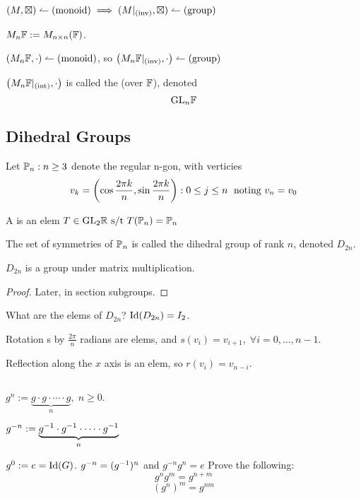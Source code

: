 \documentclass[12pt]{article}
\newcommand{\gop}[0]{\boxtimes}
\begin{document}
\((M,\gop)\is\TM{monoid}
\implies(M|_{\TM{inv}},\gop)\is\TM{group}\)

\bboxex
{} \(M_n\mathbb F:=M_{n\times n}(\mathbb F)\).

\((M_n\mathbb F,\cdot)\leftharpoonup(\mathrm{monoid})\), so
\(\left(M_n\mathbb F|_{(\mathrm{inv})},\cdot\right)
\leftharpoonup(\mathrm{group})\)
\ebox


\bboxnote
\begin{nota}\label{nota:gen_L_group}
  \(\left(M_n\mathbb F|_{(\mathrm{int})},\cdot\right)\)
  is called the 
  (over \(\mathbb F\)), denoted
  \[\mathrm{GL}_n\mathbb F\]
\end{nota}
\ebox

\subsection{Dihedral Groups}
\bbox
\begin{defn}[N-Gon]\label{defn:n_gon}
  Let \(\mathbb P_n:n\ge3\) denote the regular
  n-gon, with verticies
  \[v_k=\left(
      \cos\frac{2\pi k}n,
      \sin\frac{2\pi k}n
  \right):0\le j\le n\;
\text{ noting }v_n=v_0\]
\end{defn}
\ebox

\bbox
\begin{defn}
  A  is an
  elem \(T\in\mathrm{GL}_2\mathbb R\text{ s/t }
  T(\mathbb P_n)=\mathbb P_n\)
\end{defn}
\ebox

\bbox
\begin{defn}\label{defn:dihedral_group}
  The set of symmetries of \(\mathbb P_n\) is called the dihedral group of rank \(n\), denoted \(D_{2n}\).
\end{defn}
\ebox

\bbox
\begin{lem}
  \(D_{2n}\) is a group under matrix multiplication.
\end{lem}
\ebox

\bboxproof
\begin{proof}
  Later, in section subgroups.
\end{proof}
\ebox

What are the elems of \(D_{2n}\)?
\(\mathrm{Id}(D_{2n})=I_2\).

Rotation s by \(\frac{2\pi}n\) radians are elems, and \(s(v_i)=v_{i+1},\;\forall i=0,\dots,n-1\).

Reflection along the \(x\) axis is an elem, so \(r(v_i)=v_{n-i}\).


\bbox
\begin{defn}\label{defn:group_power}
  \(\,\)

  \(g^n:=\underset n{\underbrace{g\cdot g\cdot \cdots \cdot g}},\;n\ge 0\).

  \(g^{-n}:=\underset n{\underbrace{g^{-1}\cdot g^{-1}\cdot\cdots\cdot g^{-1}}}\)

  \(g^0:=e=\mathrm{Id}(G)\).
  \bboxnote {}
  \(g^{-n}=(g^{-1})^n\) and
  \(g^{-n}g^n=e\) Prove the following:
  \[g^ng^m=g^{n+m}\]
  \[(g^n)^m=g^{nm}\]
  \ebox
\end{defn}
\ebox
\end{document}
